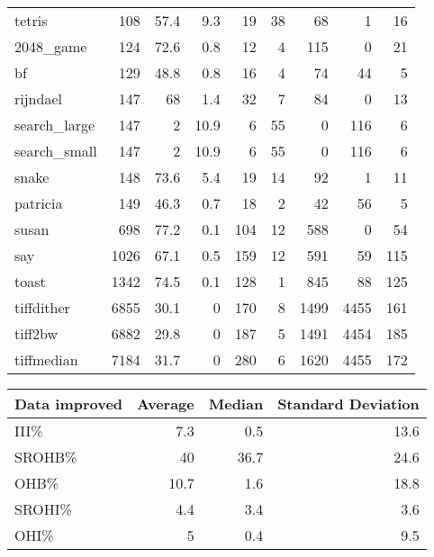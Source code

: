 \begin{tabular}{lrrrrrrrr}
 tetris          &      108 &     57.4 &    9.3 &   19 &   38 &     68 &     1 &    16 \\
 2048\_game       &      124 &     72.6 &    0.8 &   12 &    4 &    115 &     0 &    21 \\
 bf              &      129 &     48.8 &    0.8 &   16 &    4 &     74 &    44 &     5 \\
 rijndael        &      147 &     68   &    1.4 &   32 &    7 &     84 &     0 &    13 \\
 search\_large    &      147 &      2   &   10.9 &    6 &   55 &      0 &   116 &     6 \\
 search\_small    &      147 &      2   &   10.9 &    6 &   55 &      0 &   116 &     6 \\
 snake           &      148 &     73.6 &    5.4 &   19 &   14 &     92 &     1 &    11 \\
 patricia        &      149 &     46.3 &    0.7 &   18 &    2 &     42 &    56 &     5 \\
 susan           &      698 &     77.2 &    0.1 &  104 &   12 &    588 &     0 &    54 \\
 say             &     1026 &     67.1 &    0.5 &  159 &   12 &    591 &    59 &   115 \\
 toast           &     1342 &     74.5 &    0.1 &  128 &    1 &    845 &    88 &   125 \\
 tiffdither      &     6855 &     30.1 &    0   &  170 &    8 &   1499 &  4455 &   161 \\
 tiff2bw         &     6882 &     29.8 &    0   &  187 &    5 &   1491 &  4454 &   185 \\
 tiffmedian      &     7184 &     31.7 &    0   &  280 &    6 &   1620 &  4455 &   172 \\
\hline
\end{tabular}\begin{tabular}{lrrr}
\hline
 Data improved   &   Average &   Median &   Standard Deviation \\
\hline
 III\%            &       7.3 &      0.5 &                 13.6 \\
 SROHB\%          &      40   &     36.7 &                 24.6 \\
 OHB\%            &      10.7 &      1.6 &                 18.8 \\
 SROHI\%          &       4.4 &      3.4 &                  3.6 \\
 OHI\%            &       5   &      0.4 &                  9.5 \\

\end{tabular}
